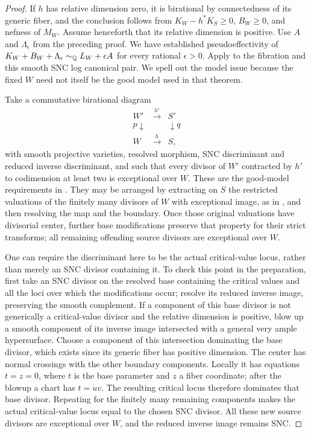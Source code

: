 \begin{proof}
If $h$ has relative dimension zero, it is birational by connectedness
of its generic fiber, and the conclusion follows from
$K_W-h^*K_S\ge0$, $B_W\ge0$, and nefness of $M_W$.
Assume henceforth that its relative dimension is positive.
Use $A$ and $\Lambda_\epsilon$ from the preceding proof.  We have
established pseudoeffectivity of
$K_W+B_W+\Lambda_\epsilon\sim_{\mathbb Q}L_W+\epsilon A$ for every rational
$\epsilon>0$.  Apply \cite[Theorem~3.4 and Remark~3.3]{CP} to the
fibration and this smooth SNC log canonical pair.  We spell out the
model issue because the fixed $W$ need not itself be the good model
used in that theorem.

Take a commutative birational diagram
\[
 \begin{array}{ccc}
  W'&\xrightarrow{h'}&S'\\
  {\scriptstyle p}\downarrow&&\downarrow{\scriptstyle q}\\
  W&\xrightarrow{h}&S,
 \end{array}
\]
with smooth projective varieties, resolved morphism, SNC discriminant
and reduced inverse discriminant, and such that every divisor of $W'$
contracted by $h'$ to codimension at least two is exceptional over
$W$.  These are the good-model requirements in
\cite[Remark~3.3]{CP}.  They may be arranged by extracting on $S$ the
restricted valuations of the finitely many divisors of $W$ with
exceptional image, as in , and then
resolving the map and the boundary.  Once those original valuations
have divisorial center, further base modifications preserve that
property for their strict transforms; all remaining offending source
divisors are exceptional over $W$.

One can require the discriminant here to be the actual critical-value
locus, rather than merely an SNC divisor containing it.  To check this
point in the preparation, first take an SNC divisor on the resolved
base containing the critical values and all the loci over which the
modifications occur; resolve its reduced inverse image, preserving
the smooth complement.  If a component of this base divisor is not
generically a critical-value divisor and the relative dimension is
positive, blow up a smooth component of its inverse image intersected
with a general very ample hypersurface.  Choose a component of this
intersection dominating the base divisor, which exists since its
generic fiber has positive dimension.  The center has normal crossings
with the other boundary components.  Locally it has equations
$t=z=0$, where $t$ is the base parameter and $z$ a fiber coordinate;
after the blowup a chart has $t=uv$.  The resulting critical locus
therefore dominates that base divisor.  Repeating for the finitely
many remaining components makes the actual critical-value locus
equal to the chosen SNC divisor.  All these new source divisors are
exceptional over $W$, and the reduced inverse image remains SNC.


\end{proof}
